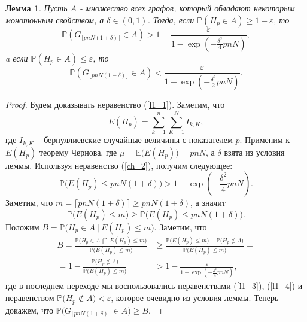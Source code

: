 \documentclass{matmex-diploma-custom}
\newcommand{\Expect}{\mathbb E}
\newcommand{\PRob}{\mathbb P}
\newcommand{\leqs}{\leqslant}
\newcommand{\geqs}{\geqslant}
\newcommand{\eps}{\varepsilon}
\newtheorem{lemma}{Лемма}
\theoremstyle{named}
\begin{document}
\begin{lemma} \label{l1}
Пусть $A$ - множество всех графов, который обладают некоторым монотонным свойством, а $\delta \in (0,1)$.
Тогда, если $\PRob( H_p \in A) \geqs 1 - \eps$, то
\begin{equation} \label{l1_1}
\PRob(G_{\lceil pnN(1+\delta) \rceil} \in A) > 1 - \frac{\eps}{1 - \exp\left(-\frac{\delta^2}{4}pnN\right)},
\end{equation}
a если $\PRob( H_p \in A) \leqs \eps$, то
\begin{equation}\label{l1_2}
\PRob(G_{\lfloor pnN(1-\delta) \rfloor} \in A) < \frac{\eps}{1 - \exp\left(-\frac{\delta^2}{2}pnN\right)}.
\end{equation}
\end{lemma}

\begin{proof}
Будем доказывать неравенство (\ref{l1_1}). Заметим, что 
\begin{equation}
E(H_p) = \sum_{k=1}^n \sum_{K=1}^N I_{k, K},
\end{equation}
где $I_{k,K}$ -- бернуллиевские случайные величины с показателем $p$.
Применим к $E(H_p)$ теорему Чернова, где $\mu = \Expect\big(E(H_p)\big) = pnN$, а $\delta$ взята из условия леммы.
Используя неравенство (\ref{ch_2}), получим следующее:
\begin{equation}\label{l1_3}
\PRob\Big( E(H_p) \leqs pnN(1+\delta) \Big) > 1 - \exp\left(-\frac{\delta^2}{4}pnN\right).
\end{equation}
Заметим, что $m = \lceil pnN(1+\delta) \rceil \geqs pnN(1+\delta)$, а значит
\begin{equation}\label{l1_4}
\PRob\Big( E(H_p) \leqs m \Big) \geqs \PRob\Big( E(H_p) \leqs pnN(1+\delta) \Big).
\end{equation}
Положим $B = \PRob\Big( H_p \in A~\big|~E(H_p) \leqs m \Big)$. Заметим, что
\begin{equation}\label{l1_big}
\begin{aligned}
B = \frac{
		\PRob\Big( H_p \in A~\bigcap~E(H_p) \leqs m \Big)
	}{
		\PRob\big(E(H_p) \leqs m \big)
	} 
&\geqs 
	\frac{
		\PRob\big(E(H_p) \leqs m \big) 
			-
		\PRob\big(H_p \not\in A \big)
	}{
		\PRob\big(E(H_p) \leqs m\big)
	}
=
\\
=
	1 
		-
	\frac{
		\PRob\big(H_p \not\in A \big)
	}{
		\PRob\big(E(H_p) \leqs m\big)
	}
&>
	1
		-
	\frac{\eps}{
		1 - \exp\left(-\frac{\delta^2}{4}pnN\right)
	},
\end{aligned}\end{equation}
где в последнем переходе мы воспользовались неравенствами (\ref{l1_3}), (\ref{l1_4}) 
и неравенством $\PRob\big(H_p \not\in A \big) < \eps$, которое очевидно из условия леммы.
Теперь докажем, что $\PRob\big(G_{\lceil pnN(1+\delta) \rceil} \in A\big) \geqs B$.


\end{proof}
\end{document}
